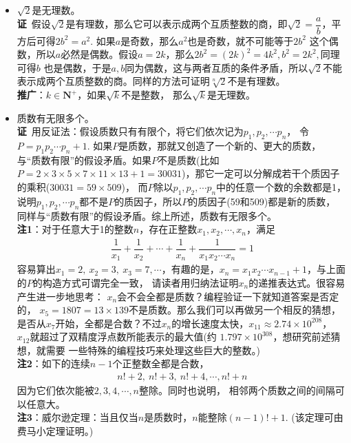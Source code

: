 \begin{itemize}[leftmargin=\inteval{\myitemleftmargin}pt,itemsep=
   \inteval{\myitemitempsep}pt,topsep=\inteval{\myitemtopsep}pt]
\item $ \sqrt{2} $是无理数。\\
\textbf{证}\ 假设$ \sqrt{2} $是有理数，那么它可以表示成两个互质整数的商，即$ \sqrt{2}=
\dfrac{a}{b} $，平方后可得$ 2b^2=a^2 $. 如果$ a $是奇数，那么$ a^2 $也是奇数，就不可能等于$ 2b^2 $
这个偶数，所以$ a $必然是偶数。假设$ a=2k $，那么$ 2b^2=(2k)^2=4k^2,b^2=2k^2, $同理可得$ b $
也是偶数，于是$ a,b $同为偶数，这与两者互质的条件矛盾，所以$ \sqrt{2} $不能表示成两个互质整数的商。同样的方法可证明$ \sqrt[n]{2} $不是有理数。\\
\textbf{推广}：$ k\in \textbf{N}^+ $，如果$ \sqrt{k} $不是整数，
那么$ \sqrt{k} $是无理数。

\item 质数有无限多个。\\
\textbf{证}\ 用反证法：假设质数只有有限个，将它们依次记为$ p_1,p_2,\cdots p_n $，
令$ P=p_1p_2\cdots p_n+1 $. 如果$ P $是质数，那就又创造了一个新的、更大的质数，
与“质数有限”的假设矛盾。如果$ P $不是质数(比如$ P = 2\times 3\times 5\times 7\times 11\times 13+1=30031 $)，那它一定可以分解成若干个质因子的乘积($ 30031=59\times 509 $)，
而$ P $除以$ p_1,p_2,\cdots p_n $中的任意一个数的余数都是1，
说明$ p_1,p_2,\cdots p_n $都不是$ P $的质因子，所以$ P $的质因子(59和509)都是新的质数，
同样与“质数有限”的假设矛盾。综上所述，质数有无限多个。\\
\textbf{注1}：对于任意大于1的整数$ n $，存在正整数$ x_1,x_2,\cdots,
x_n $，满足
\begin{align*}
    \dfrac{1}{x_1}+\dfrac{1}{x_2}+\cdots+\dfrac{1}{x_n}+
    \dfrac{1}{x_1x_2\cdots x_n}=1
\end{align*}
容易算出$ x_1=2,\ x_2=3,\ x_3=7,\cdots $，有趣的是，$ x_n=
x_1x_2\cdots x_{n-1}+1 $，与上面的$ P $的构造方式可谓完全一致，
请读者用归纳法证明$ x_n $的递推表达式。很容易产生进一步地思考：
$ x_n $会不会全都是质数？编程验证一下就知道答案是否定的，
$ x_5=1807=13\times 139 $不是质数。那么我们可以再做另一个相反的猜想，是否从$ x_7 $开始，全都是合数？不过$ x_n $的增长速度太快，$ x_{11}\approx 2.74\times 10^{208} $，
$ x_{12} $就超过了双精度浮点数所能表示的最大值(约
$ 1.797\times 10^{308} $，想研究前述猜想，就需要
一些特殊的编程技巧来处理这些巨大的整数。)\\
\textbf{注2}：如下的连续$ n-1 $个正整数全都是合数，
\begin{align*}
    n!+2,\ n!+3,\ n!+4,\cdots,n!+n
\end{align*}
因为它们依次能被$ 2,3,4,\cdots,n $整除。同时也说明，
相邻两个质数之间的间隔可以任意大。 \\
\textbf{注3}：威尔逊定理：当且仅当$ n $是质数时，$ n $能整除$ (n-1)!+1 $. (该定理可由费马小定理证明。) 


\end{itemize}
